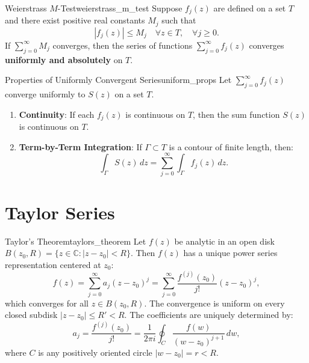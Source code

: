 \begin{theorem}{Weierstrass $M$-Test}{weierstrass_m_test}
Suppose $f_j(z)$ are defined on a set $T$ and there exist positive real constants $M_j$ such that
\begin{equation}
|f_j(z)| \le M_j \quad \forall z \in T, \quad \forall j \ge 0.
\end{equation}
If $\sum_{j=0}^\infty M_j$ converges, then the series of functions $\sum_{j=0}^\infty f_j(z)$ converges \textbf{uniformly and absolutely} on $T$.
\end{theorem}

\begin{proposition}{Properties of Uniformly Convergent Series}{uniform_props}
Let $\sum_{j=0}^\infty f_j(z)$ converge uniformly to $S(z)$ on a set $T$.
\begin{enumerate}
    \item \textbf{Continuity}: If each $f_j(z)$ is continuous on $T$, then the sum function $S(z)$ is continuous on $T$.
    \item \textbf{Term-by-Term Integration}: If $\Gamma \subset T$ is a contour of finite length, then:
    \begin{equation}
    \int_\Gamma S(z)\, dz = \sum_{j=0}^\infty \int_\Gamma f_j(z)\, dz.
    \end{equation}
\end{enumerate}
\end{proposition}


\section{Taylor Series}

\begin{theorem}{Taylor's Theorem}{taylors_theorem}
Let $f(z)$ be analytic in an open disk $B(z_0, R) = \{z \in \mathbb{C} : |z - z_0| < R\}$. Then $f(z)$ has a unique power series representation centered at $z_0$:
\begin{equation}
f(z) = \sum_{j=0}^\infty a_j (z - z_0)^j = \sum_{j=0}^\infty \frac{f^{(j)}(z_0)}{j!} (z - z_0)^j,
\end{equation}
which converges for all $z \in B(z_0, R)$. The convergence is uniform on every closed subdisk $|z - z_0| \le R' < R$.
The coefficients are uniquely determined by:
\begin{equation}
a_j = \frac{f^{(j)}(z_0)}{j!} = \frac{1}{2\pi i} \oint_C \frac{f(w)}{(w - z_0)^{j+1}}\, dw,
\end{equation}
where $C$ is any positively oriented circle $|w - z_0| = r < R$.
\end{theorem}

